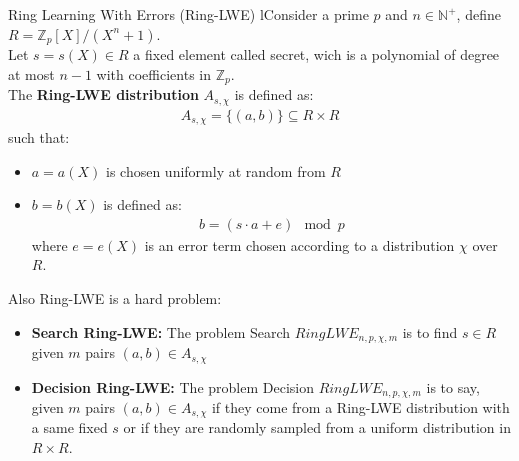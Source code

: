 \begin{defBox}{Ring Learning With Errors (Ring-LWE)}
    lConsider a prime $p$ and $n \in \mathbb{N}^+$, define $R = \mathbb{Z}_p[X] / (X^n + 1)$.\\
    Let $s = s(X) \in R$ a fixed element called secret, wich is a polynomial of degree at most $n-1$ with coefficients in $\mathbb{Z}_p$.\\
    The \textbf{Ring-LWE distribution} $A_{s, \chi}$ is defined as:
    \begin{align*}        
        A_{s, \chi} = \{(a, b) \} \subseteq R \times R
    \end{align*}
    such that:
    \begin{itemize}
        \item $a = a(X)$ is chosen uniformly at random from $R$ 
        \item $b = b(X)$ is defined as:
            \begin{align*}
                b = (s \cdot a + e) \mod p
            \end{align*}
            where $e = e(X)$ is an error term chosen according to a distribution $\chi$ over $R$.
    \end{itemize}
\end{defBox}

\noindent
Also Ring-LWE is a hard problem:
\begin{itemize}
    \item \textbf{Search Ring-LWE:} The problem Search $RingLWE_{n, p, \chi, m}$ is to find $s \in R$ given $m$ pairs $(a, b) \in A_{s, \chi}$
    \item \textbf{Decision Ring-LWE:} The problem Decision $RingLWE_{n, p, \chi, m}$ is to say, given $m$ pairs $(a, b) \in A_{s, \chi}$ if they come from a Ring-LWE distribution with a same fixed $s$ or if they are randomly sampled from a uniform distribution in $R \times R$.
\end{itemize}